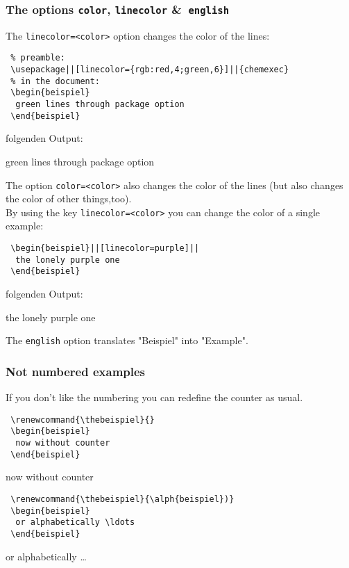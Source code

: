 \documentclass[DIV10]{scrartcl}
\begin{document}
\subsubsection{The options \texttt{color}, \texttt{linecolor} \&\ \texttt{english}}
The \verb+linecolor=<color>+ option changes the color of the lines:
\begin{lstlisting}
 % preamble:
 \usepackage||[linecolor={rgb:red,4;green,6}]||{chemexec}
 % in the document:
 \begin{beispiel}
  green lines through package option
 \end{beispiel}
\end{lstlisting}
folgenden Output:
\begin{beispiel}[linecolor={rgb:red,4;green,6}]
 green lines through package option
\end{beispiel}
\noindent The option \verb+color=<color>+ also changes the color of the lines (but also changes the color of other things,too).\\
By using the key \verb+linecolor=<color>+ you can change the color of a single example:
\begin{lstlisting}
 \begin{beispiel}||[linecolor=purple]||
  the lonely purple one
 \end{beispiel}
\end{lstlisting}
folgenden Output:
\begin{beispiel}[linecolor=purple]
 the lonely purple one
\end{beispiel}
\noindent The \verb=english= option translates "Beispiel" into "Example".

\subsubsection{Not numbered examples}
If you don't like the numbering you can redefine the counter as usual.
\begin{lstlisting}
 \renewcommand{\thebeispiel}{}
 \begin{beispiel}
  now without counter
 \end{beispiel}
\end{lstlisting}
\renewcommand{\thebeispiel}{}
\begin{beispiel}
 now without counter
\end{beispiel}
\begin{lstlisting}
 \renewcommand{\thebeispiel}{\alph{beispiel})}
 \begin{beispiel}
  or alphabetically \ldots
 \end{beispiel}
\end{lstlisting}
\renewcommand{\thebeispiel}{\alph{beispiel})}
\begin{beispiel}
 or alphabetically \ldots
\end{beispiel}
\end{document}
